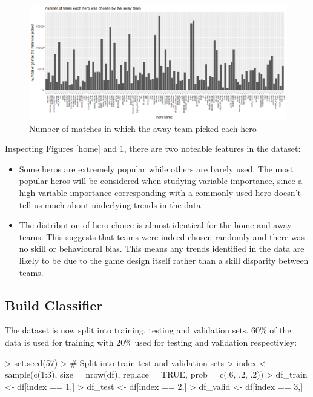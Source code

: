 \documentclass[10pt]{article}
\begin{document}
\begin{figure}[H]
\begin{center}
\includegraphics{away_team}
\caption {Number of matches in which the away team picked each hero}
\label{away}
\end {center}
\end {figure}

Inspecting Figures \ref{home} and \ref{away}, there are two noteable features in the dataset:

\begin{itemize}
\item Some heros are extremely popular while others are barely used. The most popular heros will be considered when studying variable importance, since a high variable importance corresponding with a commonly used hero doesn't tell us much about underlying trends in the data.
\item The distribution of hero choice is almost identical for the home and away teams. This suggests that teams were indeed chosen randomly and there was no skill or behavioural bias. This means any trends identified in the data are likely to be due to the game design itself rather than a skill disparity between teams.
\end{itemize}

\subsection{Build Classifier}
The dataset is now split into training, testing and validation sets. 60\% of the data is used for training with 20\% used for testing and validation respectivley:

\hspace{1cm} 
\begin{Schunk}
\begin{Sinput}
> set.seed(57)
> # Split into train test and validation sets
> index <- sample(c(1:3), size = nrow(df), replace = TRUE, prob = c(.6, .2, .2))
> df_train <- df[index == 1,]
> df_test <- df[index == 2,]
> df_valid <- df[index == 3,]
\end{Sinput}
\end{Schunk}
\hspace{1cm} 
\end{document}
